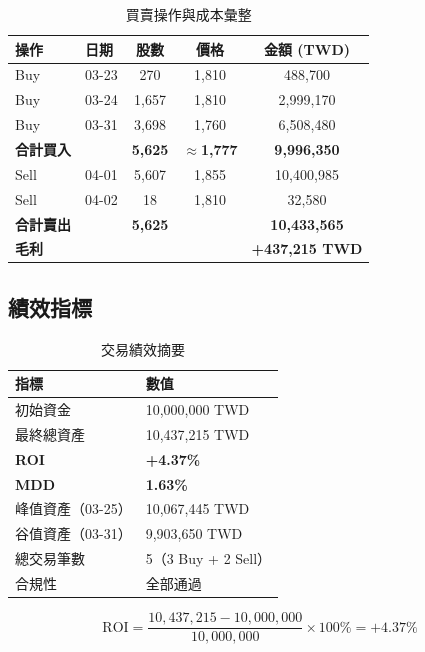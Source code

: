 \documentclass[12pt,a4paper]{article}
\begin{document}
\begin{table}[H]
\centering
\caption{買賣操作與成本彙整}
\begin{tabular}{llccc}
\toprule
\textbf{操作} & \textbf{日期} & \textbf{股數} & \textbf{價格} & \textbf{金額 (TWD)} \\
\midrule
Buy & 03-23 & 270   & 1,810 & 488,700 \\
Buy & 03-24 & 1,657 & 1,810 & 2,999,170 \\
Buy & 03-31 & 3,698 & 1,760 & 6,508,480 \\
\midrule
\textbf{合計買入} & & \textbf{5,625} & \textbf{$\approx$1,777} & \textbf{9,996,350} \\
\midrule
Sell & 04-01 & 5,607 & 1,855 & 10,400,985 \\
Sell & 04-02 & 18    & 1,810 & 32,580 \\
\midrule
\textbf{合計賣出} & & \textbf{5,625} & & \textbf{10,433,565} \\
\midrule
\textbf{毛利} & & & & \textbf{+437,215 TWD} \\
\bottomrule
\end{tabular}
\end{table}

\subsection{績效指標}

\begin{table}[H]
\centering
\caption{交易績效摘要}
\begin{tabular}{ll}
\toprule
\textbf{指標} & \textbf{數值} \\
\midrule
初始資金         & 10,000,000 TWD \\
最終總資產        & 10,437,215 TWD \\
\textbf{ROI}   & \textbf{+4.37\%} \\
\textbf{MDD}   & \textbf{1.63\%} \\
峰值資產（03-25） & 10,067,445 TWD \\
谷值資產（03-31） & 9,903,650 TWD \\
總交易筆數        & 5（3 Buy + 2 Sell） \\
合規性           & 全部通過 \\
\bottomrule
\end{tabular}
\end{table}

\begin{equation}
\text{ROI} = \frac{10{,}437{,}215 - 10{,}000{,}000}{10{,}000{,}000} \times 100\% = +4.37\%
\end{equation}
\end{document}
